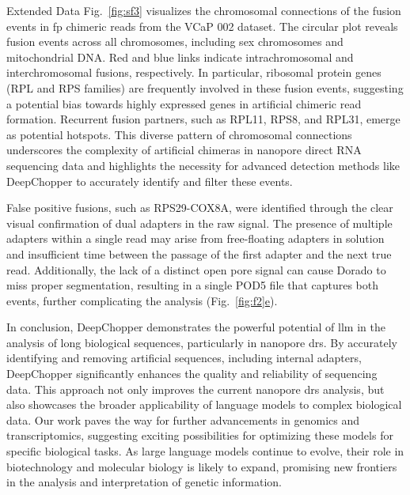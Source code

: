 \documentclass[pdflatex,sn-nature, lineno]{sn-jnl}%
\newcommand{\figref}[2]{Fig.~\hyperref[#1]{\ref*{#1}#2}}
\newcommand{\edfigref}[2]{Extended Data Fig.~\hyperref[#1]{\ref*{#1}#2}}
\theoremstyle{thmstyleone}%
\theoremstyle{thmstyletwo}%
\theoremstyle{thmstylethree}%
\begin{document}
\edfigref{fig:sf3}{} visualizes the chromosomal connections of the fusion events in \gls{fp} chimeric reads from the VCaP 002 dataset.
The circular plot reveals fusion events across all chromosomes, including sex chromosomes and mitochondrial DNA.
Red and blue links indicate intrachromosomal and interchromosomal fusions, respectively.
In particular, ribosomal protein genes (RPL and RPS families) are frequently involved in these fusion events, suggesting a potential bias towards highly expressed genes in artificial chimeric read formation.
Recurrent fusion partners, such as RPL11, RPS8, and RPL31, emerge as potential hotspots. This diverse pattern of chromosomal connections underscores the complexity of artificial chimeras in nanopore direct RNA sequencing data and highlights the necessity for advanced detection methods like DeepChopper to accurately identify and filter these events.

False positive fusions, such as RPS29-COX8A, were identified through the clear visual confirmation of dual adapters in the raw signal. The presence of multiple adapters within a single read may arise from free-floating adapters in solution and insufficient time between the passage of the first adapter and the next true read. Additionally, the lack of a distinct open pore signal can cause Dorado to miss proper segmentation, resulting in a single POD5 file that captures both events, further complicating the analysis (\figref{fig:f2}{e}).

In conclusion, DeepChopper demonstrates the powerful potential of \gls{llm} in the analysis of long biological sequences, particularly in nanopore \gls{drs}.
By accurately identifying and removing artificial sequences, including internal adapters, DeepChopper significantly enhances the quality and reliability of sequencing data.
This approach not only improves the current nanopore \gls{drs} analysis, but also showcases the broader applicability of language models to complex biological data.
Our work paves the way for further advancements in genomics and transcriptomics, suggesting exciting possibilities for optimizing these models for specific biological tasks.
As large language models continue to evolve, their role in biotechnology and molecular biology is likely to expand, promising new frontiers in the analysis and interpretation of genetic information.
\end{document}
